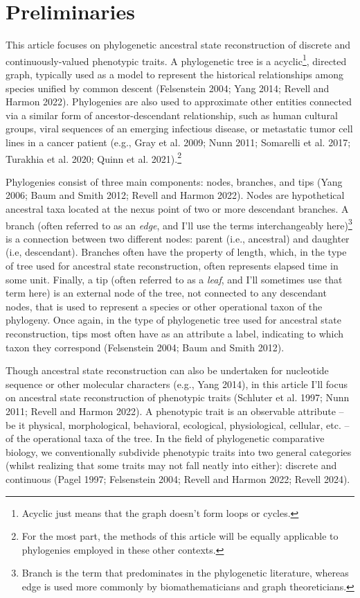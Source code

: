 \documentclass{article}
\begin{document}
\section{Preliminaries}\label{preliminaries}

This article focuses on phylogenetic ancestral state reconstruction of discrete and continuously-valued phenotypic traits. A phylogenetic tree is a acyclic\footnote{Acyclic just means that the graph doesn't form loops or cycles.}, directed graph, typically used as a model to represent the historical relationships among species unified by common descent (Felsenstein 2004; Yang 2014; Revell and Harmon 2022). Phylogenies are also used to approximate other entities connected via a similar form of ancestor-descendant relationship, such as human cultural groups, viral sequences of an emerging infectious disease, or metastatic tumor cell lines in a cancer patient (e.g., Gray et al. 2009; Nunn 2011; Somarelli et al. 2017; Turakhia et al. 2020; Quinn et al. 2021).\footnote{For the most part, the methods of this article will be equally applicable to phylogenies employed in these other contexts.}

Phylogenies consist of three main components: nodes, branches, and tips (Yang 2006; Baum and Smith 2012; Revell and Harmon 2022). Nodes are hypothetical ancestral taxa located at the nexus point of two or more descendant branches. A branch (often referred to as an \emph{edge}, and I'll use the terms interchangeably here)\footnote{Branch is the term that predominates in the phylogenetic literature, whereas edge is used more commonly by biomathematicians and graph theoreticians.} is a connection between two different nodes: parent (i.e., ancestral) and daughter (i.e, descendant). Branches often have the property of length, which, in the type of tree used for ancestral state reconstruction, often represents elapsed time in some unit. Finally, a tip (often referred to as a \emph{leaf}, and I'll sometimes use that term here) is an external node of the tree, not connected to any descendant nodes, that is used to represent a species or other operational taxon of the phylogeny. Once again, in the type of phylogenetic tree used for ancestral state reconstruction, tips most often have as an attribute a label, indicating to which taxon they correspond (Felsenstein 2004; Baum and Smith 2012).

Though ancestral state reconstruction can also be undertaken for nucleotide sequence or other molecular characters (e.g., Yang 2014), in this article I'll focus on ancestral state reconstruction of phenotypic traits (Schluter et al. 1997; Nunn 2011; Revell and Harmon 2022). A phenotypic trait is an observable attribute -- be it physical, morphological, behavioral, ecological, physiological, cellular, etc. -- of the operational taxa of the tree. In the field of phylogenetic comparative biology, we conventionally subdivide phenotypic traits into two general categories (whilst realizing that some traits may not fall neatly into either): discrete and continuous (Pagel 1997; Felsenstein 2004; Revell and Harmon 2022; Revell 2024).
\end{document}

